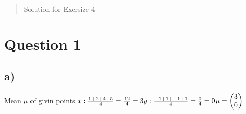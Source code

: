 \documentclass[12pt]{article}
\begin{document}
\maketitle

\begin{abstract}
Solution for Exersize 4
\end{abstract}

\section{Question 1}
\subsection{a)}
Mean  $\mu$ of givin points \newline
\begin{math}
    x : \frac{1+2+4+5}{4} = \frac{12}{4} = 3 \\
    y : \frac{-1+1+-1+1}{4} = \frac{0}{4} = 0 \\
\mu = \begin{pmatrix}
        3 \\
        0
    \end{pmatrix}
\end{math}
\end{document}
